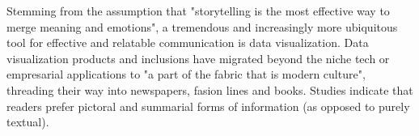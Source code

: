 Stemming from the assumption that "storytelling is the most effective way to merge meaning and emotions"\cite{WEF2021}, %
a tremendous and increasingly more ubiquitous tool for effective and relatable communication is data visualization\cite{Lupi2017,storiesGL}. %
Data visualization products and inclusions have migrated beyond the niche tech or empresarial applications to "a part of the fabric that is modern culture", threading their way into newspapers, fasion lines and books\cite{Meeks2019}. %
Studies indicate that readers prefer pictoral and summarial forms of information (as opposed to purely textual)\cite{Evans-Cowley2010}. %
